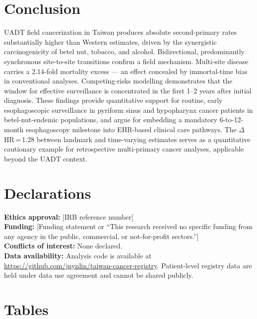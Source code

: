 \documentclass[12pt,a4paper]{article}
\begin{document}
\section{Conclusion}

UADT field cancerization in Taiwan produces absolute second-primary rates
substantially higher than Western estimates, driven by the synergistic
carcinogenicity of betel nut, tobacco, and alcohol.
Bidirectional, predominantly synchronous site-to-site transitions confirm
a field mechanism.
Multi-site disease carries a 2.14-fold mortality excess — an effect concealed by
immortal-time bias in conventional analyses.
Competing-risks modelling demonstrates that the window for effective surveillance
is concentrated in the first 1--2 years after initial diagnosis.
These findings provide quantitative support for routine, early esophagoscopic
surveillance in pyriform sinus and hypopharynx cancer patients in
betel-nut-endemic populations, and argue for embedding a mandatory
6-to-12-month esophagoscopy milestone into EHR-based clinical care pathways.
The $\Delta$HR\,=\,1.28 between landmark and time-varying estimates serves
as a quantitative cautionary example for retrospective multi-primary cancer
analyses, applicable beyond the UADT context.

\section*{Declarations}
\textbf{Ethics approval:} [IRB reference number]\\
\textbf{Funding:} [Funding statement or ``This research received no specific
funding from any agency in the public, commercial, or not-for-profit sectors.'']\\
\textbf{Conflicts of interest:} None declared.\\
\textbf{Data availability:} Analysis code is available at
\url{https://github.com/jnynlin/taiwan-cancer-registry}.
Patient-level registry data are held under data use agreement and cannot be
shared publicly.

\newpage
\section*{Tables}
\end{document}

